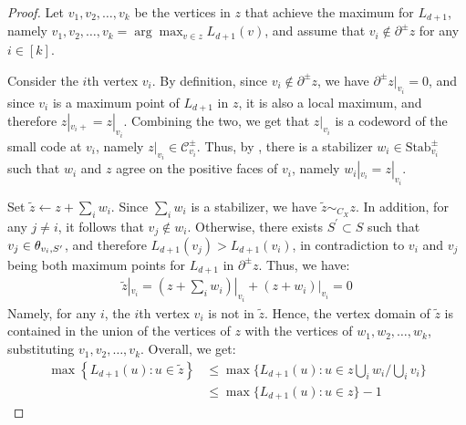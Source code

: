 \begin{proof}
Let $v_{1}, v_{2}, \ldots, v_{k}$ be the vertices in $z$ that achieve the maximum for $L_{d+1}$, namely $v_{1}, v_{2}, \ldots, v_{k} = \arg \max_{v \in z} L_{d+1}(v)$, and assume that $v_{i} \notin \partial^{\pm} z$ for any $i \in [k]$.

Consider the $i$th vertex $v_{i}$. By definition, since $v_{i} \notin \partial^{\pm} z$, we have $\partial^{\pm} z|_{v_{i}} = 0$, and since $v_{i}$ is a maximum point of $L_{d+1}$ in $z$, it is also a local maximum, and therefore $z|_{v_{i}+} = z|_{v_{i}}$. 
Combining the two, we get that $z|_{v_{i}}$ is a codeword of the small code at $v_{i}$, namely $z|_{v_{i}} \in \mathcal{C}_{v_{i}}^{\pm}$. Thus, by , there is a stabilizer $w_{i} \in \text{Stab}_{v_{i}}^{\pm}$ such that $w_{i}$ and $z$ agree on the positive faces of $v_{i}$, namely $w_{i}|_{v_{i}} = z|_{v_{i}}$. 

Set $\tilde{z} \leftarrow z + \sum_{i}w_{i}$. Since $\sum_{i}w_{i}$ is a stabilizer, we have $\tilde{z} \sim_{C_{X}} z$. In addition, for any $j \neq i$, it follows that $v_{j} \notin w_{i}$.
Otherwise, there exists $S^{\prime} \subset S$ such that $v_{j} \in \theta_{v_{i} ,S^{\prime}}$, and therefore $L_{d+1}(v_{j}) > L_{d+1}(v_{i})$, in contradiction to $v_{i}$ and $v_{j}$ being both maximum points for $L_{d+1}$ in $\partial^{\pm} z$. 
Thus, we have:
\begin{equation*}
  \begin{split}
    \tilde{z}|_{v_{i}} = (z + \sum_{i}w_{i})|_{v_{i}} + (z + w_{i})|_{v_{i}} = 0
  \end{split}
\end{equation*}
Namely, for any $i$, the $i$th vertex $v_{i}$ is not in $\tilde{z}$. Hence, the vertex domain of $\tilde{z}$ is contained in the union of the vertices of $z$ with the vertices of $w_{1}, w_{2}, \ldots, w_{k}$, substituting $v_{1}, v_{2}, \ldots, v_{k}$. Overall, we get:
\begin{equation*}
  \begin{split}
  \max \left\{ L_{d+1}(u) : u \in \tilde{z} \right\} & \le \max \big\{ L_{d+1}(u) : u \in z \bigcup_{i} w_{i} \big/ \bigcup_{i} v_{i} \big\}  \\ 
     & \le  \max \big\{ L_{d+1}(u) : u \in z \big\} - 1
  \end{split}
\end{equation*}
\end{proof}

